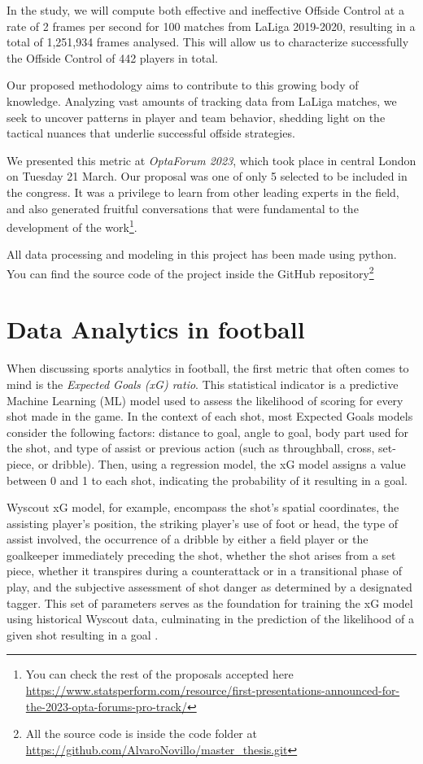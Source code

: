 \documentclass[
  10pt,
  twoside,nohyper]{book}
\begin{document}
In the study, we will compute both effective and ineffective Offside Control at a rate of 2 frames per second for 100 matches from LaLiga 2019-2020, resulting in a total of 1,251,934 frames analysed. This will allow us to characterize successfully the Offside Control of 442 players in total.

Our proposed methodology aims to contribute to this growing body of knowledge. Analyzing vast amounts of tracking data from LaLiga matches, we seek to uncover patterns in player and team behavior, shedding light on the tactical nuances that underlie successful offside strategies.

We presented this metric at \emph{OptaForum 2023}, which took place in central London on Tuesday 21 March. Our proposal was one of only 5 selected to be included in the congress. It was a privilege to learn from other leading experts in the field, and also generated fruitful conversations that were fundamental to the development of the work\footnote{You can check the rest of the proposals accepted here \url{https://www.statsperform.com/resource/first-presentations-announced-for-the-2023-opta-forums-pro-track/}}.

All data processing and modeling in this project has been made using python. You can find the source code of the project inside the GitHub repository\footnote{All the source code is inside the code folder at \url{https://github.com/AlvaroNovillo/master_thesis.git}}

\chapter{Data Analytics in football}\label{data-analytics-in-football}

When discussing sports analytics in football, the first metric that
often comes to mind is the \emph{Expected Goals (xG) ratio}. This statistical indicator is a predictive Machine Learning (ML) model used to assess the likelihood of scoring for every shot made in the game. In the context of each shot, most Expected Goals models consider the following factors: distance to goal, angle to goal, body part used for the shot, and type of assist or previous action (such as throughball, cross, set-piece, or dribble). Then, using a regression model, the xG model assigns a value between 0 and 1 to each shot, indicating the probability of it resulting in a goal.

Wyscout xG model, for example, encompass the shot's spatial coordinates, the assisting player's position, the striking player's use of foot or head, the type of assist involved, the occurrence of a dribble by either a field player or the goalkeeper immediately preceding the shot, whether the shot arises from a set piece, whether it transpires during a counterattack or in a transitional phase of play, and the subjective assessment of shot danger as determined by a designated tagger. This set of parameters serves as the foundation for training the xG model using historical Wyscout data, culminating in the prediction of the likelihood of a given shot resulting in a goal \citep{wyscout}.
\end{document}
